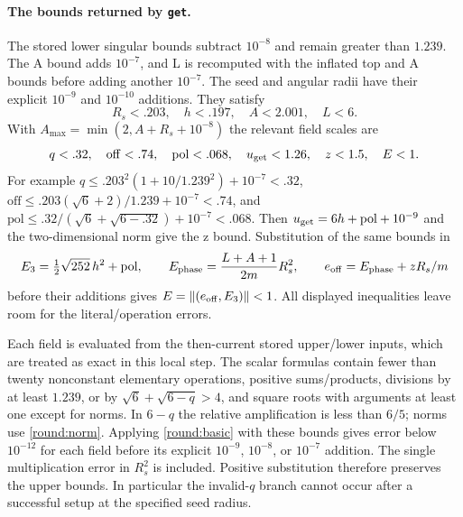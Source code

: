 \paragraph{The bounds returned by \texttt{get}.}
The stored lower singular bounds subtract $10^{-8}$ and remain
greater than $1.239$.  The A bound adds $10^{-7}$, and L is recomputed
with the inflated top and A bounds before adding another $10^{-7}$.
The seed and angular radii have their explicit $10^{-9}$ and
$10^{-10}$ additions.  They satisfy
\[
 R_s<.203,\quad h<.197,\quad A<2.001,\quad L<6.
\]
With $A_{\max}=\min(2,A+R_s+10^{-8})$ the relevant field scales are
\begin{equation}\label{round:get-scales}
 q<.32,\quad \mathrm{off}<.74,\quad \mathrm{pol}<.068,
 \quad u_{\rm get}<1.26,\quad z<1.5,\quad E<1.
\end{equation}
For example
$q\le .203^2(1+10/1.239^2)+10^{-7}<.32$,
$\mathrm{off}\le .203(\sqrt6+2)/1.239+10^{-7}<.74$, and
$\mathrm{pol}\le .32/(\sqrt6+\sqrt{6-.32})+10^{-7}<.068$.
Then $u_{\rm get}=6h+\mathrm{pol}+10^{-9}$ and the two-dimensional
norm give the z bound.  Substitution of the same bounds in
\[
 E_3=\tfrac12\sqrt{252}\,h^2+\mathrm{pol},\qquad
 E_{\rm phase}=\frac{L+A+1}{2m}R_s^2,
 \qquad e_{\rm off}=E_{\rm phase}+zR_s/m
\]
before their additions gives $E=\|(e_{\rm off},E_3)\|<1$.
All displayed inequalities leave room for the literal/operation errors.

Each field is evaluated from the then-current stored upper/lower
inputs, which are treated as exact in this local step.  The scalar
formulas contain fewer than twenty nonconstant elementary operations,
positive sums/products, divisions by at least $1.239$, or by
$\sqrt6+\sqrt{6-q}>4$, and square roots with arguments at least one
except for norms.  In $6-q$ the relative amplification is less than
$6/5$; norms use \eqref{round:norm}.  Applying
\eqref{round:basic} with these bounds gives error below $10^{-12}$
for each field before its explicit $10^{-9}$, $10^{-8}$, or $10^{-7}$
addition.  The single multiplication error in $R_s^2$ is included.
Positive substitution therefore preserves the upper bounds.
In particular the invalid-$q$ branch cannot occur after a successful
setup at the specified seed radius.

